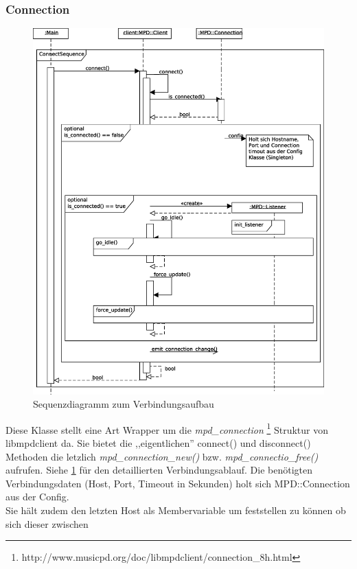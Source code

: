 \subsubsection{Connection}
\begin{figure}[htb!]
	\centering
        \includegraphics[scale=0.5]{ConnectSequence.eps}
	\caption{Sequenzdiagramm zum Verbindungsaufbau}
	\label{seq_client_connect}
\end{figure}
Diese Klasse stellt eine Art Wrapper um die \textit{mpd\_connection}
\footnote{http://www.musicpd.org/doc/libmpdclient/connection\_8h.html} Struktur von libmpdclient da.
Sie bietet die ,,eigentlichen'' connect() und disconnect() Methoden die letzlich \textit{mpd\_connection\_new()} bzw. \textit{mpd\_connectio\_free()} aufrufen. Siehe \ref{seq_client_connect} für den detaillierten Verbindungsablauf. Die benötigten Verbindungsdaten (Host, Port, Timeout in Sekunden) holt sich MPD::Connection aus der Config.
\\
Sie hält zudem den letzten Host als Membervariable um feststellen zu können ob sich dieser zwischen 
